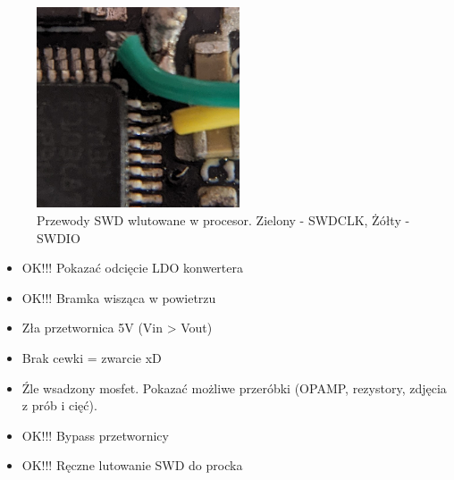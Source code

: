 \begin{figure}[H]
    \centering
    \includegraphics[width=6cm]{Graphics/fix_swd.png}
    \caption{Przewody SWD wlutowane w procesor. Zielony - SWDCLK, Żółty - SWDIO}
    \label{img:fix_swd}
\end{figure}
\begin{itemize}
    \item OK!!! Pokazać odcięcie LDO konwertera
    \item OK!!! Bramka wisząca w powietrzu
    \item Zła przetwornica 5V (Vin > Vout)
    \item Brak cewki = zwarcie xD
    \item Źle wsadzony mosfet. Pokazać możliwe przeróbki (OPAMP, rezystory, zdjęcia z prób i cięć).
    \item OK!!! Bypass przetwornicy
    \item OK!!! Ręczne lutowanie SWD do procka
\end{itemize}

